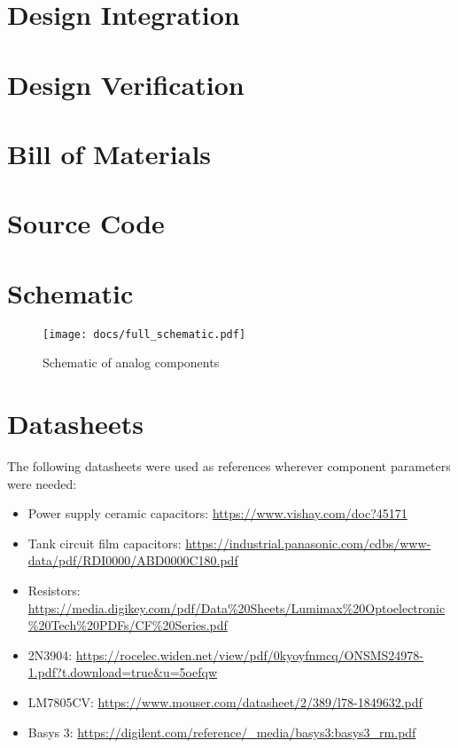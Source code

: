 \documentclass[12pt]{article}
\numberwithin{figure}{section}
\numberwithin{equation}{section}
\begin{document}
\section{Design Integration} 

\section{Design Verification} 


\section{Bill of Materials}

\section{Source Code}
    
\section{Schematic} 
\begin{figure}[H] 
    \centering 
    \texttt{[image: docs/full\_schematic.pdf]}
    \caption{Schematic of analog components} 
    \label{schematic}
\end{figure}

\section{Datasheets}
The following datasheets were used as references wherever component parameters were needed: 

\begin{itemize} 
    \item Power supply ceramic capacitors: \url{https://www.vishay.com/doc?45171} 
    \item Tank circuit film capacitors: \url{https://industrial.panasonic.com/cdbs/www-data/pdf/RDI0000/ABD0000C180.pdf}
    \item Resistors: \url{https://media.digikey.com/pdf/Data%20Sheets/Lumimax%20Optoelectronic%20Tech%20PDFs/CF%20Series.pdf}
    \item 2N3904: \url{https://rocelec.widen.net/view/pdf/0kyoyfnmcq/ONSMS24978-1.pdf?t.download=true&u=5oefqw} 
    \item LM7805CV: \url{https://www.mouser.com/datasheet/2/389/l78-1849632.pdf}
    \item Basys 3: \url{https://digilent.com/reference/_media/basys3:basys3_rm.pdf}
\end{itemize}
\end{document}
